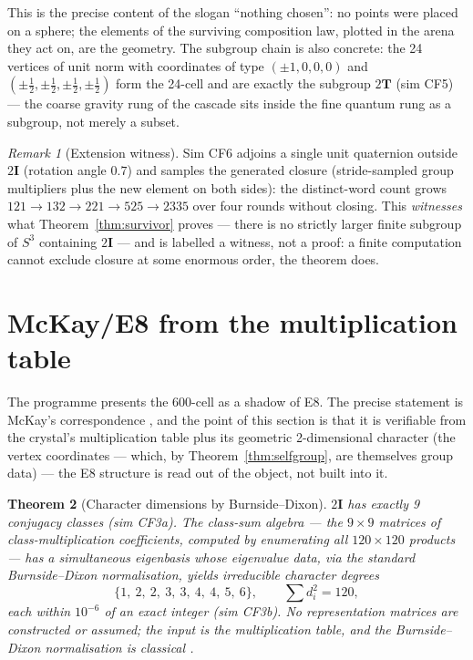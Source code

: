\documentclass[12pt]{article}
\newtheorem{theorem}{Theorem}
\theoremstyle{definition}
\theoremstyle{remark}
\newtheorem{remark}[theorem]{Remark}
\newcommand{\twoI}{2\mathbf{I}}
\newcommand{\twoT}{2\mathbf{T}}
\begin{document}
This is the precise content of the slogan ``nothing chosen'': no points were placed on a sphere; the elements of the surviving composition law, plotted in the arena they act on, are the geometry. The subgroup chain is also concrete: the 24 vertices of unit norm with coordinates of type $(\pm1,0,0,0)$ and $(\pm\tfrac12,\pm\tfrac12,\pm\tfrac12,\pm\tfrac12)$ form the 24-cell and are exactly the subgroup $\twoT$ (sim CF5) --- the coarse gravity rung of the cascade sits inside the fine quantum rung as a subgroup, not merely a subset.

\begin{remark}[Extension witness]\label{rem:witness}
Sim CF6 adjoins a single unit quaternion outside $\twoI$ (rotation angle $0.7$) and samples the generated closure (stride-sampled group multipliers plus the new element on both sides): the distinct-word count grows $121 \to 132 \to 221 \to 525 \to 2335$ over four rounds without closing. This \emph{witnesses} what Theorem~\ref{thm:survivor} proves --- there is no strictly larger finite subgroup of $S^3$ containing $\twoI$ --- and is labelled a witness, not a proof: a finite computation cannot exclude closure at some enormous order, the theorem does.
\end{remark}

\section{McKay/E8 from the multiplication table}\label{sec:mckay}

The programme presents the 600-cell as a shadow of E8. The precise statement is McKay's correspondence \citep{McKay1980}, and the point of this section is that it is verifiable from the crystal's multiplication table plus its geometric 2-dimensional character (the vertex coordinates --- which, by Theorem~\ref{thm:selfgroup}, are themselves group data) --- the E8 structure is read out of the object, not built into it.

\begin{theorem}[Character dimensions by Burnside--Dixon]\label{thm:dims}
$\twoI$ has exactly 9 conjugacy classes (sim CF3a). The class-sum algebra --- the $9\times9$ matrices of class-multiplication coefficients, computed by enumerating all $120 \times 120$ products --- has a simultaneous eigenbasis whose eigenvalue data, via the standard Burnside--Dixon normalisation, yields irreducible character degrees
$$\{1,\ 2,\ 2,\ 3,\ 3,\ 4,\ 4,\ 5,\ 6\}, \qquad \textstyle\sum d_i^2 = 120,$$
each within $10^{-6}$ of an exact integer (sim CF3b). No representation matrices are constructed or assumed; the input is the multiplication table, and the Burnside--Dixon normalisation is classical \citep{Dixon1967}.
\end{theorem}
\end{document}

